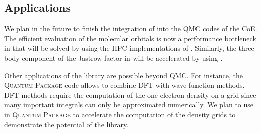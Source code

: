 \subsection{Applications}

\newcommand{\qp}{\textsc{Quantum Package}}

We plan in the future to finish the integration of \QMCkl{} into the \ac{QMC}
codes of the \ac{CoE}. The efficient evaluation of the molecular orbitals is
now a performance bottleneck in \turbo{} that will be solved by using the
\ac{HPC} implementations of \QMCkl{}. Similarly, the three-body component of
the Jastrow factor in \champ{} will be accelerated by using \QMCkl{}.

Other applications of the library are possible beyond \ac{QMC}. For instance, 
the \qp{} code allows to combine \ac{DFT} with wave function
methods. \ac{DFT} methods require the computation of the one-electron density on 
a grid since many important integrals can only be approximated numerically. We
plan to use \QMCkl{} in \qp{} to accelerate the computation of the density grids
to demonstrate the potential of the library.



\clearpage


